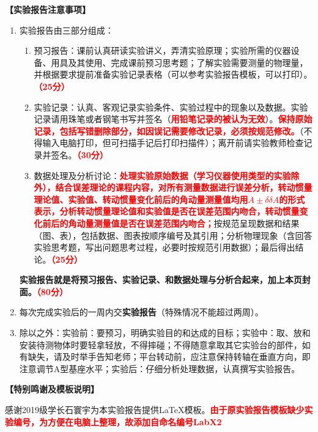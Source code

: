 \documentclass[dvipsnames, svgnames,a4paper,11pt]{article}
\begin{document}
	\textbf{【实验报告注意事项】}
	\begin{enumerate}
		\item 实验报告由三部分组成：
		\begin{enumerate}
			\item 预习报告：课前认真研读实验讲义，弄清实验原理；实验所需的仪器设备、用具及其使用、完成课前预习思考题；了解实验需要测量的物理量，并根据要求提前准备实验记录表格（可以参考实验报告模板，可以打印）。\textcolor{red}{\textbf{（25分）}}
			\item 实验记录：认真、客观记录实验条件、实验过程中的现象以及数据。实验记录请用珠笔或者钢笔书写并签名（\textcolor{red}{\textbf{用铅笔记录的被认为无效}}）。\textcolor{red}{\textbf{保持原始记录，包括写错删除部分，如因误记需要修改记录，必须按规范修改。}}（不得输入电脑打印，但可扫描手记后打印扫描件）；离开前请实验教师检查记录并签名。\textcolor{red}{\textbf{（30分）}}
			\item 数据处理及分析讨论：\textcolor{red}{\textbf{处理实验原始数据（学习仪器使用类型的实验除外），结合误差理论的课程内容，对所有测量数据进行误差分析，转动惯量理论值、实验值、转动惯量变化前后的角动量测量值均用$A±δ\delta A$的形式表示，分析转动惯量理论值和实验值是否在误差范围内吻合，转动惯量变化前后的角动量测量值是否在误差范围内吻合；}}按规范呈现数据和结果（图、表），包括数据、图表按顺序编号及其引用；分析物理现象（含回答实验思考题，写出问题思考过程，必要时按规范引用数据）；最后得出结论。\textcolor{red}{\textbf{（25分）}}
		\end{enumerate}
		\textbf{实验报告就是将预习报告、实验记录、和数据处理与分析合起来，加上本页封面。\textcolor{red}{（80分）}}
		\item 每次完成实验后的一周内交\textbf{实验报告}（特殊情况不能超过两周）。
		\item 除以之外：实验前：要预习，明确实验目的和达成的目标；实验中：取、放和安装待测物体时要轻拿轻放，不得摔碰；不得随意拿取其它实验台的部件，如有缺失，请及时举手告知老师；平台转动前，应注意保持转轴在垂直方向，即注意调节A型基座水平；实验后：仔细分析处理数据，认真撰写实验报告。
	\end{enumerate}
	
	
	
	\textbf{【特别鸣谢及模板说明】}	
	
	感谢2019级学长石寰宇为本实验报告提供\LaTeX 模板。\textcolor{red}{\textbf{由于原实验报告模板缺少实验编号，为方便在电脑上整理，故添加自命名编号LabX2}}
	
	
	
	\clearpage
	\tableofcontents
	\clearpage
	
\end{document}
